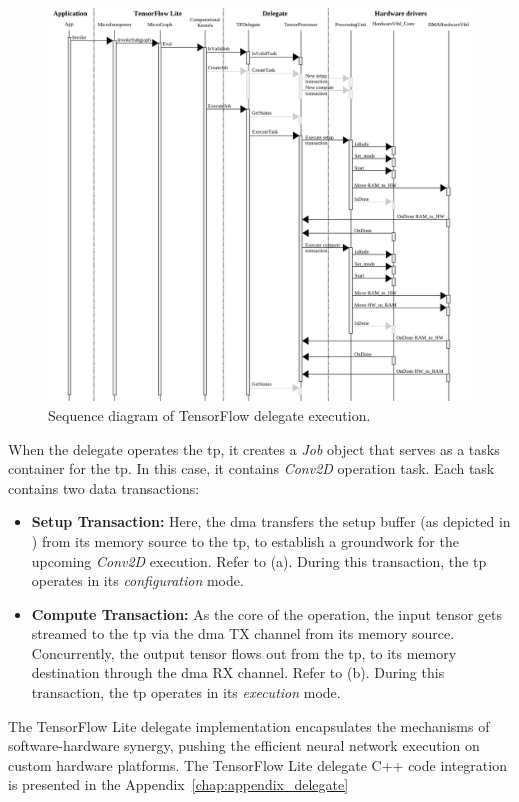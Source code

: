 \begin{figure}[h!]
	\centering
	\includegraphics[width=\textwidth]{./figures/sequence_tfl_delegate_acceleration.pdf}
	\caption{Sequence diagram of TensorFlow delegate execution.}
	\label{fig:sw_tf_delegate_execution_diagram}
\end{figure}

When the delegate operates the \gls{tp}, it creates a \textit{Job} object that serves as a tasks container for the \gls{tp}. In this case, it contains \textit{Conv2D} operation task. Each task contains two data transactions:

\begin{itemize}
	\item \textbf{Setup Transaction:} Here, the \gls{dma} transfers the setup buffer (as depicted in ) from its memory source to the \gls{tp}, to establish a groundwork for the upcoming \textit{Conv2D} execution. Refer to (a). During this transaction, the \gls{tp} operates in its \textit{configuration} mode.
	\item \textbf{Compute Transaction:} As the core of the operation, the input tensor gets streamed to the \gls{tp} via the \gls{dma} TX channel from its memory source. Concurrently, the output tensor flows out from the \gls{tp}, to its memory destination through the \gls{dma} RX channel. Refer to (b). During this transaction, the \gls{tp} operates in its \textit{execution} mode.
\end{itemize}

The TensorFlow Lite delegate implementation encapsulates the mechanisms of software-hardware synergy, pushing the efficient neural network execution on custom hardware platforms. The TensorFlow Lite delegate C++ code integration is presented in the Appendix~\ref{chap:appendix_delegate}
\FloatBarrier